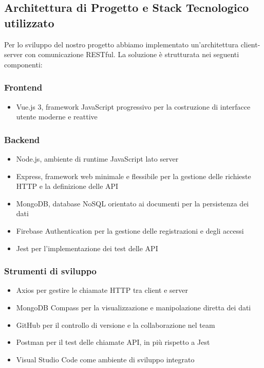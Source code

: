 \subsection{Architettura di Progetto e Stack Tecnologico utilizzato}
Per lo sviluppo del nostro progetto abbiamo implementato un'architettura client-server con comunicazione RESTful. La soluzione è strutturata nei seguenti componenti:

\subsubsection*{Frontend}
    \begin{itemize}
    \item Vue.js 3, framework JavaScript progressivo per la costruzione di interfacce utente moderne e reattive
    \end{itemize}
    
\subsubsection*{Backend}
    \begin{itemize}
    \item Node.js, ambiente di runtime JavaScript lato server
    \item Express, framework web minimale e flessibile per la gestione delle richieste HTTP e la definizione delle API
    \item MongoDB, database NoSQL orientato ai documenti per la persistenza dei dati
    \item Firebase Authentication per la gestione delle registrazioni e degli accessi
    \item Jest per l'implementazione dei test delle API
    \end{itemize}
    
\subsubsection*{Strumenti di sviluppo}
    \begin{itemize}
    \item Axios per gestire le chiamate HTTP tra client e server
    \item MongoDB Compass per la visualizzazione e manipolazione diretta dei dati
    \item GitHub per il controllo di versione e la collaborazione nel team
    \item Postman per il test delle chiamate API, in più rispetto a Jest
    \item Visual Studio Code come ambiente di sviluppo integrato
    \end{itemize}

